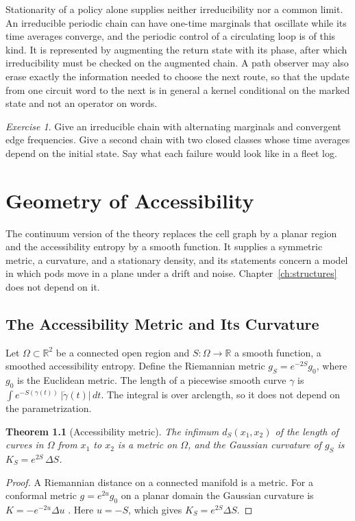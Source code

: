 \documentclass[11pt,openany]{book}
\theoremstyle{plain}
\newtheorem{theorem}{Theorem}[chapter]
\theoremstyle{definition}
\theoremstyle{remark}
\newtheorem{exercise}[theorem]{Exercise}
\newcommand{\R}{\mathbb{R}}
\begin{document}
Stationarity of a policy alone supplies neither irreducibility nor a common limit. An irreducible periodic chain can have one-time marginals that oscillate while its time averages converge, and the periodic control of a circulating loop is of this kind. It is represented by augmenting the return state with its phase, after which irreducibility must be checked on the augmented chain. A path observer may also erase exactly the information needed to choose the next route, so that the update from one circuit word to the next is in general a kernel conditional on the marked state and not an operator on words.

\begin{exercise}
Give an irreducible chain with alternating marginals and convergent edge frequencies. Give a second chain with two closed classes whose time averages depend on the initial state. Say what each failure would look like in a fleet log.
\end{exercise}

\chapter{Geometry of Accessibility}
\label{ch:geometry}

The continuum version of the theory replaces the cell graph by a planar region and the accessibility entropy by a smooth function. It supplies a symmetric metric, a curvature, and a stationary density, and its statements concern a model in which pods move in a plane under a drift and noise. Chapter~\ref{ch:structures} does not depend on it.

\section{The Accessibility Metric and Its Curvature}

Let $\Omega\subset\R^2$ be a connected open region and $S:\Omega\to\R$ a smooth function, a smoothed accessibility entropy. Define the Riemannian metric $g_S=e^{-2S}g_0$, where $g_0$ is the Euclidean metric. The length of a piecewise smooth curve $\gamma$ is $\int e^{-S(\gamma(t))}\,|\dot\gamma(t)|\,dt$. The integral is over arclength, so it does not depend on the parametrization.

\begin{theorem}[Accessibility metric]
\label{thm:accmetric}
The infimum $d_S(x_1,x_2)$ of the length of curves in $\Omega$ from $x_1$ to $x_2$ is a metric on $\Omega$, and the Gaussian curvature of $g_S$ is $K_S=e^{2S}\,\Delta S$.
\end{theorem}
\begin{proof}
A Riemannian distance on a connected manifold is a metric. For a conformal metric $g=e^{2u}g_0$ on a planar domain the Gaussian curvature is $K=-e^{-2u}\Delta u$ \cite{docarmo}. Here $u=-S$, which gives $K_S=e^{2S}\Delta S$.
\end{proof}
\end{document}
